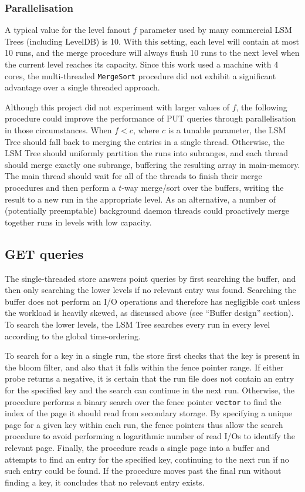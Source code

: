 \documentclass{acm}
\begin{document}
\subsubsection{Parallelisation}

A typical value for the level fanout $f$ parameter used by many commercial LSM Trees (including LevelDB) is 10. With this setting, each level will contain at most 10 runs, and the merge procedure will always flush 10 runs to the next level when the current level reaches its capacity. Since this work used a machine with 4 cores, the multi-threaded \texttt{MergeSort} procedure did not exhibit a significant advantage over a single threaded approach.

Although this project did not experiment with larger values of $f$, the following procedure could improve the performance of PUT queries through parallelisation in those circumstances. When $f < c$, where $c$ is a tunable parameter, the LSM Tree should fall back to merging the entries in a single thread. Otherwise, the LSM Tree should uniformly partition the runs into subranges, and each thread should merge exactly one subrange, buffering the resulting array in main-memory. The main thread should wait for all of the threads to finish their merge procedures and then perform a $t$-way merge/sort over the buffers, writing the result to a new run in the appropriate level. As an alternative, a number of (potentially preemptable) background daemon threads could proactively merge together runs in levels with low capacity.

\subsection{GET queries}

The single-threaded store answers point queries by first searching the buffer, and then only searching the lower levels if no relevant entry was found. Searching the buffer does not perform an I/O operations and therefore has negligible cost unless the workload is heavily skewed, as discussed above (see ``Buffer design'' section). To search the lower levels, the LSM Tree searches every run in every level according to the global time-ordering.

To search for a key in a single run, the store first checks that the key is present in the bloom filter, and also that it falls within the fence pointer range. If either probe returns a negative, it is certain that the run file does not contain an entry for the specified key and the search can continue in the next run. Otherwise, the procedure performs a binary search over the fence pointer \texttt{vector} to find the index of the page it should read from secondary storage. By specifying a unique page for a given key within each run, the fence pointers thus allow the search procedure to avoid performing a logarithmic number of read I/Os to identify the relevant page. Finally, the procedure reads a single page into a buffer and attempts to find an entry for the specified key, continuing to the next run if no such entry could be found. If the procedure moves past the final run without finding a key, it concludes that no relevant entry exists. 
\end{document}
